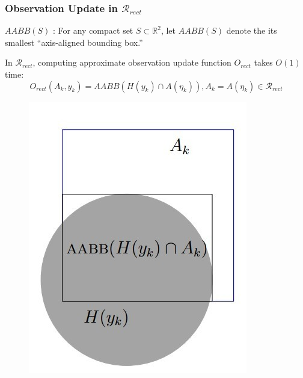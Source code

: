 \documentclass[compress]{beamer}
\begin{document}
\begin{frame} \frametitle{Observation Update in $\mathcal{R}_{rect}$}
\begin{definition}{\textbf{$AABB(S)$} :}
    For any compact set $S \subset \mathbb{R}^2$, let $AABB(S)$
	denote the its smallest	``axis-aligned bounding box.''
\end{definition}

In $\mathcal{R}_{rect}$, computing approximate observation update function $O_{rect}$ takes $O(1)$ time:\\
$$ O_{rect}(A_k, y_k) = AABB(H(y_k) \cap A(\eta_k)), A_k = A(\eta_k) \in \mathcal{R}_{rect}$$
    \begin{figure}
    \includegraphics[scale=0.27]{circlerect.jpg}
    \end{figure}
\transboxout
\end{frame}
\end{document}
